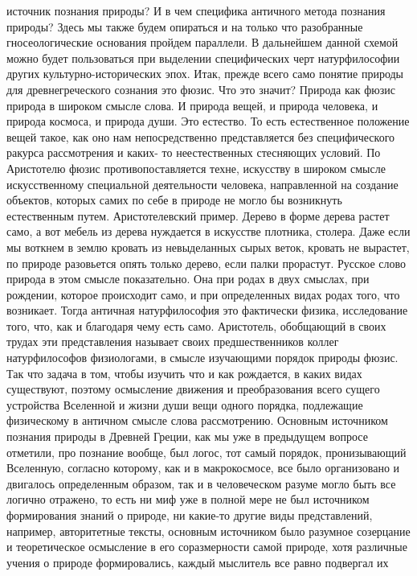 источник познания природы? И в чем специфика античного метода познания природы?
Здесь мы также будем опираться и на только что разобранные гносеологические
основания пройдем параллели. В дальнейшем данной схемой можно будет пользоваться
при выделении специфических черт натурфилософии других культурно-исторических
эпох. Итак, прежде всего само понятие природы для древнегреческого сознания это
фюзис. Что это значит? Природа как фюзис природа в широком смысле слова. И
природа вещей, и природа человека, и природа космоса, и природа души. Это
естество. То есть естественное положение вещей такое, как оно нам
непосредственно представляется без специфического ракурса рассмотрения и каких-
то неестественных стесняющих условий. По Аристотелю фюзис противопоставляется
техне, искусству в широком смысле искусственному специальной деятельности
человека, направленной на создание объектов, которых самих по себе в природе не
могло бы возникнуть естественным путем. Аристотелевский пример. Дерево в форме
дерева растет само, а вот мебель из дерева нуждается в искусстве плотника,
столера. Даже если мы воткнем в землю кровать из невыделанных сырых веток,
кровать не вырастет, по природе разовьется опять только дерево, если палки
прорастут. Русское слово природа в этом смысле показательно. Она при родах в
двух смыслах, при рождении, которое происходит само, и при определенных видах
родах того, что возникает. Тогда античная натурфилософия это фактически физика,
исследование того, что, как и благодаря чему есть само. Аристотель, обобщающий в
своих трудах эти представления называет своих предшественников коллег
натурфилософов физиологами, в смысле изучающими порядок природы фюзис. Так что
задача в том, чтобы изучить что и как рождается, в каких видах существуют,
поэтому осмысление движения и преобразования всего сущего устройства Вселенной и
жизни души вещи одного порядка, подлежащие физическому в античном смысле слова
рассмотрению. Основным источником познания природы в Древней Греции, как мы уже
в предыдущем вопросе отметили, про познание вообще, был логос, тот самый
порядок, пронизывающий Вселенную, согласно которому, как и в макрокосмосе, все
было организовано и двигалось определенным образом, так и в человеческом разуме
могло быть все логично отражено, то есть ни миф уже в полной мере не был
источником формирования знаний о природе, ни какие-то другие виды представлений,
например, авторитетные тексты, основным источником было разумное созерцание и
теоретическое осмысление в его соразмерности самой природе, хотя различные
учения о природе формировались, каждый мыслитель все равно подвергал их

